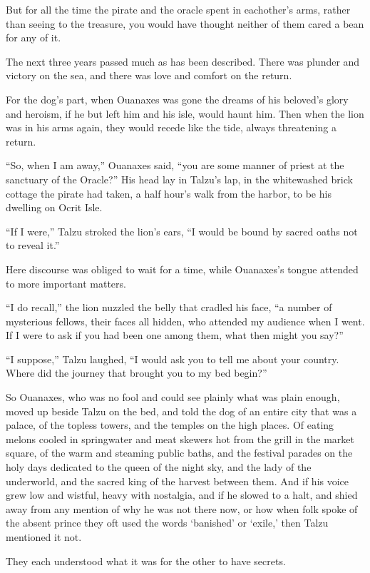 But for all the time the pirate and the oracle spent in eachother's arms, rather than seeing to the treasure, you would have thought neither of them cared a bean for any of it.

The next three years passed much as has been described. There was plunder and victory on the sea, and there was love and comfort on the return.

For the dog's part, when Ouanaxes was gone the dreams of his beloved's glory and heroism, if he but left him and his isle, would haunt him. Then when the lion was in his arms again, they would recede like the tide, always threatening a return.

``So, when I am away,'' Ouanaxes said, ``you are some manner of priest at the sanctuary of the Oracle?'' His head lay in Talzu's lap, in the whitewashed brick cottage the pirate had taken, a half hour's walk from the harbor, to be his dwelling on Ocrit Isle.

``If I were,'' Talzu stroked the lion's ears, ``I would be bound by sacred oaths not to reveal it.''

Here discourse was obliged to wait for a time, while Ouanaxes's tongue attended to more important matters.

``I do recall,'' the lion nuzzled the belly that cradled his face, ``a number of mysterious fellows, their faces all hidden, who attended my audience when I went. If I were to ask if you had been one among them, what then might you say?''

``I suppose,'' Talzu laughed, ``I would ask you to tell me about your country. Where did the journey that brought you to my bed begin?''

So Ouanaxes, who was no fool and could see plainly what was plain enough, moved up beside Talzu on the bed, and told the dog of an entire city that was a palace, of the topless towers, and the temples on the high places. Of eating melons cooled in springwater and meat skewers hot from the grill in the market square, of the warm and steaming public baths, and the festival parades on the holy days dedicated to the queen of the night sky, and the lady of the underworld, and the sacred king of the harvest between them. And if his voice grew low and wistful, heavy with nostalgia, and if he slowed to a halt, and shied away from any mention of why he was not there now, or how when folk spoke of the absent prince they oft used the words `banished' or `exile,' then Talzu mentioned it not.

They each understood what it was for the other to have secrets.

